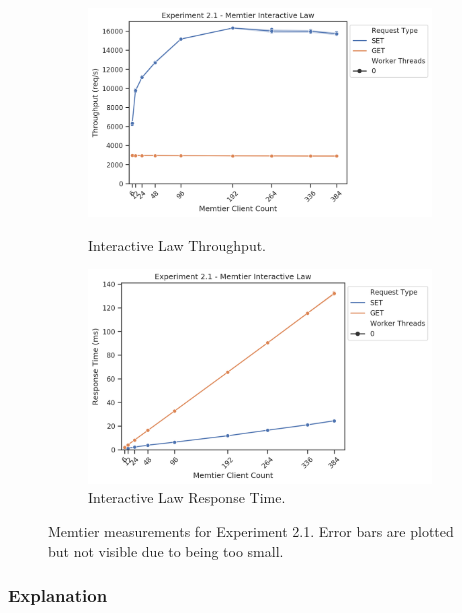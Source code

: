 \begin{figure}
\begin{subfigure}[t!]{0.45\textwidth}
                \centering
                \includegraphics[width=\textwidth]{../data_analysis/figures/2-1_mt_throughput-il.png}
                \caption{Interactive Law \textendash{} Throughput.\label{fig:21_mt_tp_il}}
                \includegraphics[width=\textwidth]{../data_analysis/figures/2-1_mt_response-time-il.png}
                \caption{Interactive Law \textendash{} Response Time.\label{fig:21_mt_rt_il}}
            \end{subfigure}
            \caption{Memtier measurements for Experiment 2.1. Error bars are plotted but not visible due to being too
                     small.}
            \label{fig:21_all}
        \end{figure}

        \subsubsection{Explanation}

